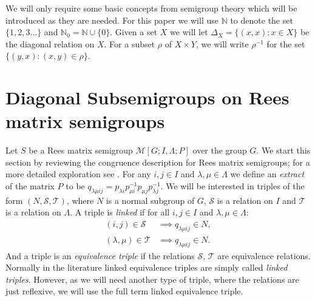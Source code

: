 \documentclass[a4paper, 12pt,reqno]{amsart}
\theoremstyle{plain}
\theoremstyle{definition}
\theoremstyle{remark}
\newcommand{\N}{\mathbb{N}}
\newcommand{\RM}{\mathcal{M}[G;I,\Lambda;P]}
\begin{document}
We will only require some basic concepts from semigroup theory which will be introduced as they are needed.
For this paper we will use $\N$ to denote the set $\{1,2,3\dots \}$ and $\N_0=\N\cup\{0\}$.
Given a set $X$ we will let $\Delta_X = \{(x,x) : x \in X \}$ be the diagonal relation on $X$. 
For a subset $\rho$ of $X \times Y$, we will write $\rho^{-1}$ for the set $\{(y,x): (x,y) \in \rho\}$.

\section{Diagonal Subsemigroups on Rees matrix semigroups}

Let $S$ be a Rees matrix semigroup $\RM$ over the group $G$.
We start this section by reviewing the congruence description for Rees matrix semigroups; for a more detailed exploration see \cite[Section 3.5]{Ho95}.
For any $i,j \in I$ and $\lambda , \mu \in \Lambda$ we define an \textit{extract} of the matrix $P$ to be $q_{\lambda \mu i j} = p_{\lambda i} p^{-1}_{\mu i} p_{\mu j} p_{\lambda j}^{-1}$.
We will be interested in triples of the form $(N,\mathcal{S},\mathcal{T})$, where $N$ is a normal subgroup of $G$, $\mathcal{S}$ is a relation on $I$ and $\mathcal{T}$ is a relation on $\Lambda$.
A triple is \textit{linked} if for all $i,j \in I$ and $\lambda,\mu \in \Lambda$:
\begin{align*}
    (i,j) \in \mathcal{S} & \implies q_{\lambda \mu i j} \in N, \\
    (\lambda,\mu) \in \mathcal{T} & \implies q_{\lambda \mu i j} \in N.
\end{align*}
And a triple is an \textit{equivalence triple} if the relations $\mathcal{S}$, $\mathcal{T}$ are equivalence relations.
Normally in the literature linked equivalence triples are simply called \textit{linked triples}.
However, as we will need another type of triple, where the relations are just reflexive, we will use the full term linked equivalence triple.
\end{document}
